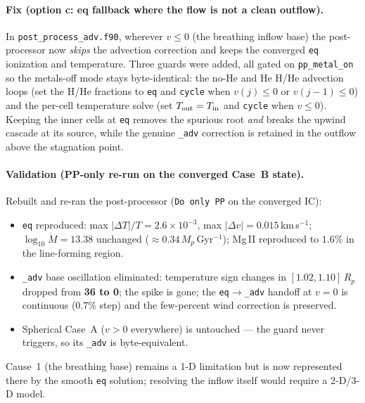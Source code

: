 \documentclass[english,a4paper]{kiseon_memo}
\begin{document}
\paragraph{Fix (option c: eq fallback where the flow is not a clean outflow).}
In \texttt{post\_process\_adv.f90}, wherever $v\le0$ (the breathing inflow base)
the post-processor now \emph{skips} the advection correction and keeps the
converged \texttt{eq} ionization and temperature. Three guards were added, all
gated on \texttt{pp\_metal\_on} so the metals-off mode stays byte-identical: the
no-He and He H/He advection loops (set the H/He fractions to \texttt{eq} and
\texttt{cycle} when $v(j)\le0$ or $v(j-1)\le0$) and the per-cell temperature solve
(set $T_{\rm out}=T_{\rm in}$ and \texttt{cycle} when $v\le0$). Keeping the inner
cells at \texttt{eq} removes the spurious root \emph{and} breaks the upwind cascade
at its source, while the genuine \texttt{\_adv} correction is retained in the
outflow above the stagnation point.

\paragraph{Validation (PP-only re-run on the converged Case~B state).} Rebuilt and
re-ran the post-processor (\texttt{Do only PP} on the converged IC):
\begin{itemize}\itemsep1pt
\item \texttt{eq} reproduced: max $|\Delta T|/T = 2.6\times10^{-3}$,
  max $|\Delta v| = 0.015$\,km\,s$^{-1}$; $\log_{10}\dot M = 13.38$ unchanged
  ($\approx0.34\,M_p$\,Gyr$^{-1}$); Mg\,II reproduced to $1.6\%$ in the
  line-forming region.
\item \texttt{\_adv} base oscillation eliminated: temperature sign changes in
  $[1.02,1.10]\,R_p$ dropped from \textbf{36 to 0}; the spike is gone; the
  \texttt{eq}$\to$\texttt{\_adv} handoff at $v=0$ is continuous ($0.7\%$ step) and
  the few-percent wind correction is preserved.
\item Spherical Case~A ($v>0$ everywhere) is untouched --- the guard never
  triggers, so its \texttt{\_adv} is byte-equivalent.
\end{itemize}
Cause~1 (the breathing base) remains a 1-D limitation but is now represented there
by the smooth \texttt{eq} solution; resolving the inflow itself would require a
2-D/3-D model.
\end{document}
